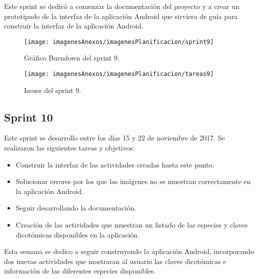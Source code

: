Este sprint se dedicó a comenzar la documentación del proyecto y a crear un prototipado de la interfaz de la aplicación Android que sirviera de guía para construir la interfaz de la aplicación Android.

\begin{figure}[h]
    \begin{center}%
        \begin{center}%
          \texttt{[image: imagenesAnexos/imagenesPlanificacion/sprint9]}%
          \caption{Gráfico Burndown del sprint 9.}%
          \label{figSprint9}%
        \end{center}%
  	\end{center}%
\end{figure}%

\begin{figure}[h]
    \begin{center}%
        \begin{center}%
          \texttt{[image: imagenesAnexos/imagenesPlanificacion/tareas9]}%
          \caption{Issues del sprint 9.}%
          \label{figTareas9}%
        \end{center}%
  	\end{center}%
\end{figure}%

\newpage

\subsection{Sprint 10}

Este sprint se desarrollo entre los días 15 y 22 de noviembre de 2017. Se realizaron las siguientes tareas y objetivos:

\begin{itemize}
	\item Construir la interfaz de las actividades creadas hasta este punto.
	\item Solucionar errores por los que las imágenes no se muestran correctamente en la aplicación Android.
	\item Seguir desarrollando la documentación.
	\item Creación de las actividades que muestran un listado de las especies y claves dicotómicas disponibles en la aplicación.
\end{itemize}

Esta semana se dedico a seguir construyendo la aplicación Android, incorporando dos nuevas actividades que mostraran al usuario las claves dicotómicas e información de las diferentes especies disponibles.


